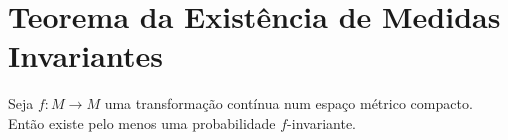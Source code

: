 

\chapter{Teorema da Existência de Medidas Invariantes}

\begin{teorema}\label{temi}

Seja $f:M\to M$ uma transformação contínua num espaço métrico compacto. Então existe pelo menos uma probabilidade $f$-invariante.

\end{teorema}

























